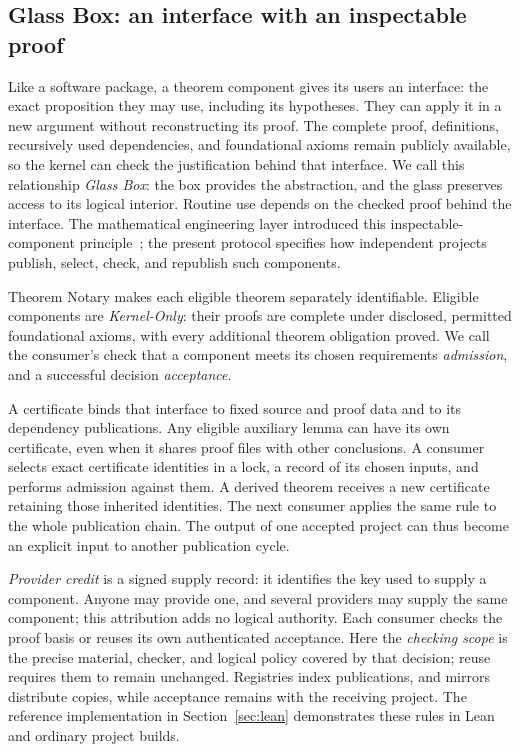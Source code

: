 \documentclass[11pt]{article}
\begin{document}
\subsection{Glass Box: an interface with an inspectable proof}

Like a software package, a theorem component gives its users an interface:
the exact proposition they may use, including its hypotheses. They can apply
it in a new argument without reconstructing its proof. The complete proof,
definitions, recursively used dependencies, and foundational axioms remain
publicly available, so the kernel can check the justification behind that
interface. We call this relationship \emph{Glass Box}: the box provides the
abstraction, and the glass preserves access to its logical interior. Routine use depends on the checked proof behind the interface.
The mathematical engineering layer introduced this inspectable-component
principle~\citep{engineering}; the present protocol specifies how independent
projects publish, select, check, and republish such components.

Theorem Notary makes each eligible theorem separately identifiable. Eligible
components are \emph{Kernel-Only}: their proofs are complete under disclosed,
permitted foundational axioms, with every additional theorem obligation
proved.
We call the consumer's check that a component meets its chosen requirements
\emph{admission}, and a successful decision \emph{acceptance}.

A certificate binds that interface to fixed source and proof data and to its
dependency publications. Any eligible auxiliary lemma can have its own
certificate, even when it shares proof files with other conclusions. A
consumer selects exact certificate identities in a lock, a record of its
chosen inputs, and performs admission against them. A derived theorem receives
a new certificate retaining those inherited identities. The next consumer
applies the same rule to the whole publication chain. The output of one accepted
project can thus become an explicit input to another publication cycle.

\emph{Provider credit} is a signed supply record: it identifies the key used
to supply a component. Anyone may provide
one, and several providers may supply the same component; this attribution adds
no logical authority. Each consumer checks the proof basis or reuses its own
authenticated acceptance. Here the \emph{checking scope} is the precise material,
checker, and logical policy covered by that decision; reuse requires them to
remain unchanged. Registries index publications, and mirrors distribute copies,
while acceptance remains with the receiving project. The reference implementation
in Section~\ref{sec:lean} demonstrates these rules in Lean and ordinary project builds.
\end{document}
